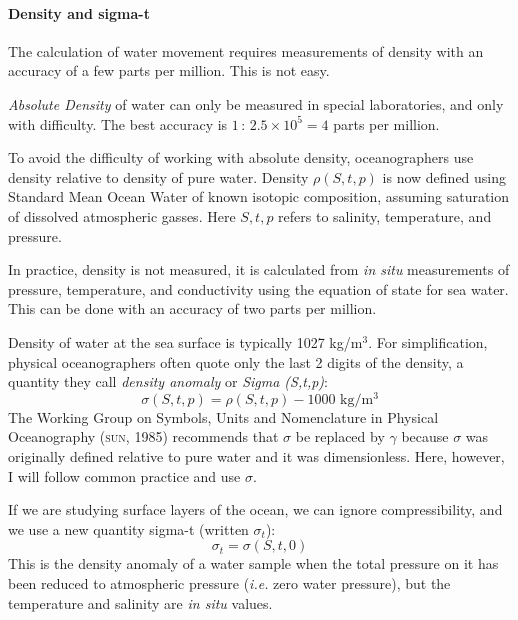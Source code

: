 \paragraph{Density and sigma-t}
The calculation of water movement requires measurements
of density with an accuracy of a few parts per
million. This is not easy.

\textit{Absolute Density} of water can
only be measured in special laboratories, and only with
difficulty. The best accuracy is $1\,:\, 2.5 \times 10^5 = 4$ parts
per million.

To avoid the difficulty of working with absolute density,
oceanographers use density relative to density of pure water. Density
$\rho (S, t, p)$ is now defined using Standard Mean Ocean Water of
known isotopic composition, assuming saturation of dissolved
atmospheric gasses. Here $S, t, p$ refers to salinity, temperature,
and pressure.

In practice, density is not measured, it is calculated from \textit{in
  situ}  measurements of pressure, temperature, and
conductivity using the equation of state for sea water. This can be
done with an accuracy of two parts per
million.

Density of water at the sea surface is typically 1027 kg/m$^3$. For
simplification, physical oceanographers often quote only the last 2
digits of the density, a quantity they call \textit{density anomaly}
or \textit{Sigma (S,t,p)}:
\begin{equation}
\sigma(S,t,p) = \rho (S, t, p) - 1000 \text{\ kg/m$^3$}
\end{equation}
The Working Group on Symbols, Units and Nomenclature in Physical
Oceanography (\textsc{sun}, 1985) recommends that $\sigma$ be replaced
by $\gamma$ because $\sigma$ was originally defined relative to pure
water and it was dimensionless. Here, however, I will follow common
practice and use $\sigma$.

If we are studying surface layers of the ocean, we can ignore
compressibility, and we use a new quantity sigma-t (written $\sigma_t$):
\begin{equation}
\sigma _t =  \sigma(S,t,0)
\end{equation}
This is the density anomaly of a water sample when the total pressure
on it has been reduced to atmospheric pressure (\textit{i.e.} zero
water pressure), but the temperature and salinity are \textit{in situ}
values.

